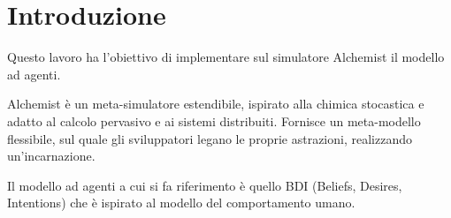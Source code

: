\documentclass[12pt,a4paper,openright,twoside]{report}
\begin{document}
\begin{titlepage}

\thispagestyle{empty}

\topmargin=6.5cm

\raggedleft

\large

\em


\newpage

\clearpage{\pagestyle{empty}\cleardoublepage}
\end{titlepage}

\chapter*{Introduzione} %


Questo lavoro ha l'obiettivo di implementare sul simulatore Alchemist il modello ad agenti.

Alchemist \`e un meta-simulatore estendibile, ispirato alla chimica stocastica e adatto al calcolo pervasivo e ai sistemi distribuiti. Fornisce un meta-modello flessibile, sul quale gli sviluppatori legano le proprie astrazioni, realizzando un'incarnazione.

Il modello ad agenti a cui si fa riferimento \`e quello BDI (Beliefs, Desires, Intentions) che \`e ispirato al modello del comportamento umano.


\clearpage{\pagestyle{empty}\cleardoublepage}

\tableofcontents

\rhead[\fancyplain{}{\bfseries\leftmark}]{\fancyplain{}{\bfseries\thepage}}
\end{document}
